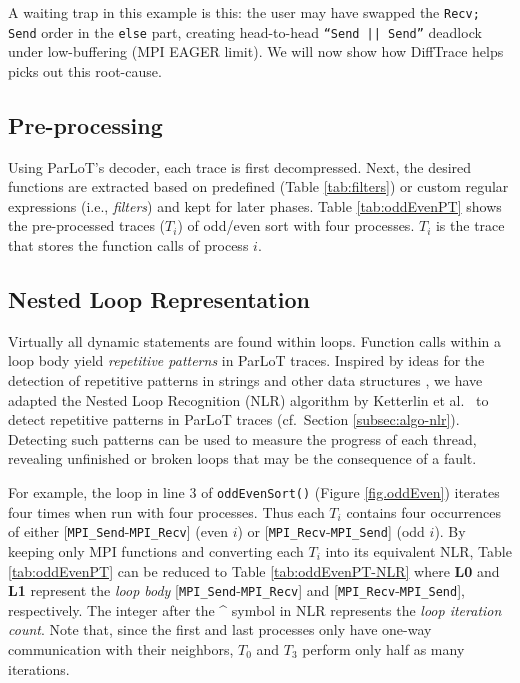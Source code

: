 A waiting trap in this example is this: the user may have
swapped the {\tt Recv; Send} order in the {\tt else} part,
creating head-to-head {\tt ``Send || Send''} deadlock
under low-buffering (MPI EAGER limit).
%
We will now show how DiffTrace helps picks out this root-cause.

\subsection{Pre-processing}

Using ParLoT's decoder, each trace is first decompressed.
Next, the desired functions are extracted based on predefined
(Table \ref{tab:filters}) or custom regular expressions
(i.e., \textit{filters}) and kept for later phases.
%
Table \ref{tab:oddEvenPT} shows the pre-processed traces ($T_i$) of odd/even sort with four processes.
$T_i$ is the trace that stores the function calls of process $i$.


\subsection{Nested Loop Representation}



Virtually all dynamic statements are found within loops.
%
Function calls within a loop body yield \textit{repetitive patterns}
in ParLoT traces.
%
Inspired by ideas for the detection of repetitive patterns in strings \cite{nakamura_fast_2013}
and other data structures \cite{kmr},
we have adapted the Nested Loop Recognition (NLR) algorithm by Ketterlin et al.~\cite{Ketterlin-nlr}
to detect repetitive patterns in ParLoT traces (cf.~Section \ref{subsec:algo-nlr}).
Detecting such patterns can be used to measure the progress of each thread,
revealing unfinished or broken loops that may be the consequence of a fault.

For example, the loop in line 3 of \texttt{oddEvenSort()} (Figure \ref{fig.oddEven}) iterates
four times when run with four processes.
Thus each $T_i$ contains four occurrences of either [\texttt{MPI\_Send}-\texttt{MPI\_Recv}] (even $i$)
or [\texttt{MPI\_Recv}-\texttt{MPI\_Send}] (odd $i$).
By keeping only MPI functions and converting each $T_i$ into its equivalent NLR,
Table \ref{tab:oddEvenPT} can be reduced to Table \ref{tab:oddEvenPT-NLR} where \textbf{L0} and \textbf{L1}
represent the \textit{loop body} [\texttt{MPI\_Send}-\texttt{MPI\_Recv}] and
[\texttt{MPI\_Recv}-\texttt{MPI\_Send}], respectively.
The integer after the \^{} symbol in NLR represents the \textit{loop iteration count}.
Note that, since the first and last processes only have one-way communication with their neighbors,
$T_0$ and $T_3$ perform only half as many iterations.


